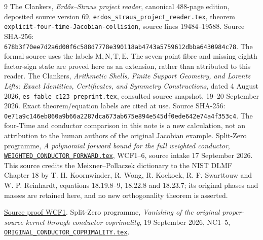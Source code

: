 \documentclass[11pt]{article}
\begin{document}
\begin{thebibliography}{9}
 The Clankers, \emph{Erd\H{o}s--Straus project reader},
canonical 488-page edition, deposited source version 69,
\texttt{erdos\_straus\_project\_reader.tex}, theorem
\texttt{explicit-four-time-Jacobian-collision}, source lines
19484--19588. Source SHA-256:
\texttt{678b3f70ee7d2a6d00f6c588d7778e390118ab4743a5759612dbba6430984c78}.
The formal source uses the labels $\mathrm M,\mathrm N,\mathrm T,\mathrm E$.
The seven-point fibre and missing eighth factor-sign state are proved
here as an extension, rather than attributed to this reader.
 The Clankers, \emph{Arithmetic Shells, Finite Support Geometry,
and Lorentz Lifts: Exact Identities, Certificates, and Symmetry Constructions},
dated 4 August 2026, \texttt{es\_fable\_c123\_preprint.tex},
consulted source snapshot, 19--20 September 2026. Exact theorem/equation
labels are cited at use. Source SHA-256:
\texttt{0e71a9c146eb860a9b66a2287dca673ab675e894e545df0ede642e74a4f353c4}.
The four-Time and conductor comparison in
this note is a new calculation, not an attribution to the human authors
of the original Jacobian example.
 Split-Zero programme, \emph{A polynomial forward bound for
the full weighted conductor}, \href{https://github.com/KokunoYumeto/zeta-function-research-reader/blob/5992ad50c0f2a06921f1fcaded7b4e38097c0739/workbenches/splitzero-tandem/continuations/20260920-original-kernel-mixed-determinants/providers/WEIGHTED_CONDUCTOR_FORWARD.tex\#L1}{\texttt{WEIGHTED\_CONDUCTOR\_FORWARD.tex}},
WCF1--6, source intake 17 September 2026. This source credits the
Meixner--Pollaczek dictionary to the NIST DLMF Chapter 18 by T. H. Koornwinder, R. Wong, R. Koekoek, R. F. Swarttouw and W. P. Reinhardt, equations
18.19.8--9, 18.22.8 and 18.23.7; its original phases and masses are
retained here, and no new orthogonality theorem is asserted.

\href{https://github.com/KokunoYumeto/zeta-function-research-reader/blob/5992ad50c0f2a06921f1fcaded7b4e38097c0739/workbenches/splitzero-tandem/continuations/20260920-original-kernel-mixed-determinants/providers/WEIGHTED_CONDUCTOR_FORWARD.tex\#L28}{Source proof WCF1}.
 Split-Zero programme, \emph{Vanishing of the original
proper-source kernel through conductor coprimality}, 19 September 2026,
NC1--5, \href{https://github.com/KokunoYumeto/zeta-function-research-reader/blob/5992ad50c0f2a06921f1fcaded7b4e38097c0739/workbenches/splitzero-tandem/continuations/20260920-original-kernel-mixed-determinants/providers/ORIGINAL_CONDUCTOR_COPRIMALITY.tex\#L1}{\texttt{ORIGINAL\_CONDUCTOR\_COPRIMALITY.tex}}.


\end{thebibliography}
\end{document}
